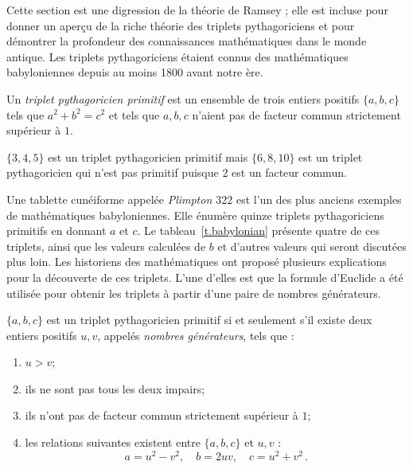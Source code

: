 Cette section est une digression de la théorie de Ramsey ; elle est incluse pour donner un aperçu de la riche théorie des triplets pythagoriciens et pour démontrer la profondeur des connaissances mathématiques dans le monde antique. Les triplets pythagoriciens étaient connus des mathématiques babyloniennes depuis au moins 1800 avant notre ère.
\begin{definition}
Un \emph{triplet pythagoricien primitif} est un ensemble de trois entiers positifs $\{a,b,c\}$ tels que $a^2+b^2=c^2$ et tels que $a,b,c$ n'aient pas de facteur commun strictement supérieur à $1$.
\end{definition}
\begin{example}
$\{3,4,5\}$ est un triplet pythagoricien primitif mais $\{6,8,10\}$ est un triplet pythagoricien qui n'est pas primitif puisque $2$ est un facteur commun.
\end{example}
Une tablette cunéiforme appelée \emph{Plimpton $322$} est l'un des plus anciens exemples de mathématiques babyloniennes. Elle énumère quinze triplets pythagoriciens primitifs en donnant $a$ et $c$. Le tableau~\ref{t.babylonian} présente quatre de ces triplets, ainsi que les valeurs calculées de $b$ et d'autres valeurs qui seront discutées plus loin. Les historiens des mathématiques ont proposé plusieurs explications pour la découverte de ces triplets. L'une d'elles est que la formule d'Euclide a été utilisée pour obtenir les triplets à partir d'une paire de nombres générateurs.
\begin{theorem}[Euclide]
$\{a,b,c\}$ est un triplet pythagoricien primitif si et seulement s'il existe deux entiers positifs $u,v$, appelés \emph{nombres générateurs}, tels que :\label{thm.euclid-function}
\begin{enumerate}
\item $u>v$;
\item ils ne sont pas tous les deux impairs;
\item ils n'ont pas de facteur commun strictement supérieur à $1$;
\item les relations suivantes existent entre $\{a,b,c\}$ et $u,v$ :
\[
a=u^2-v^2,\quad b=2uv,\quad c=u^2+v^2\,.
\]
\end{enumerate}
\end{theorem}

